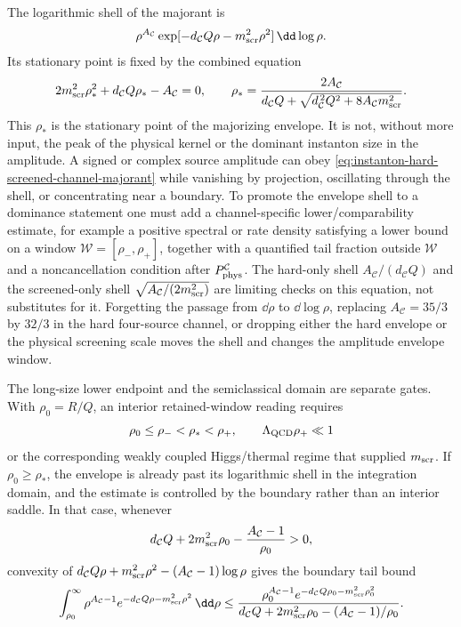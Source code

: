 \begin{controlledapproximation}
The logarithmic shell of the majorant is
\[
  \rho^{A_{\mathcal C}}
  \exp[-d_{\mathcal C}Q\rho-m_{\rm scr}^2\rho^2]\,\dd\log\rho .
\]
Its stationary point is fixed by the combined equation
\begin{equation}
  2m_{\rm scr}^2\rho_*^2+d_{\mathcal C}Q\rho_*-A_{\mathcal C}=0,
  \qquad
  \rho_*=
  \frac{2A_{\mathcal C}}
       {d_{\mathcal C}Q+
        \sqrt{d_{\mathcal C}^{\,2}Q^2+8A_{\mathcal C}m_{\rm scr}^2}} .
  \label{eq:instanton-hard-screened-log-shell}
\end{equation}
This \(\rho_*\) is the stationary point of the majorizing envelope.  It is not,
without more input, the peak of the physical kernel or the dominant instanton
size in the amplitude.  A signed or complex source amplitude can obey
\eqref{eq:instanton-hard-screened-channel-majorant} while vanishing by
projection, oscillating through the shell, or concentrating near a boundary.
To promote the envelope shell to a dominance statement one must add a
channel-specific lower/comparability estimate, for example a positive spectral
or rate density satisfying a lower bound on a window
\(\mathcal W=[\rho_-,\rho_+]\), together with a quantified tail fraction outside
\(\mathcal W\) and a noncancellation condition after \(P_{\rm phys}^{\mathcal C}\).
The hard-only shell \(A_{\mathcal C}/(d_{\mathcal C}Q)\) and the
screened-only shell \(\sqrt{A_{\mathcal C}/(2m_{\rm scr}^2)}\) are limiting
checks on this equation, not substitutes for it.  Forgetting the passage from
\(\dd\rho\) to \(\dd\log\rho\), replacing \(A_{\mathcal C}=35/3\) by
\(32/3\) in the hard four-source channel, or dropping either the hard envelope
or the physical screening scale moves the shell and changes the amplitude
envelope window.

The long-size lower endpoint and the semiclassical domain are separate gates.
With \(\rho_0=R/Q\), an interior retained-window reading requires
\[
  \rho_0\le \rho_-<\rho_*<\rho_+,
  \qquad
  \Lambda_{\rm QCD}\rho_+\ll1
\]
or the corresponding weakly coupled Higgs/thermal regime that supplied
\(m_{\rm scr}\).  If \(\rho_0\ge\rho_*\), the envelope is already past its
logarithmic shell in the integration domain, and the estimate is controlled by
the boundary rather than an interior saddle.  In that case, whenever
\[
  d_{\mathcal C}Q+2m_{\rm scr}^2\rho_0
  -\frac{A_{\mathcal C}-1}{\rho_0}>0,
\]
convexity of
\(
d_{\mathcal C}Q\rho+m_{\rm scr}^2\rho^2-(A_{\mathcal C}-1)\log\rho
\)
gives the boundary tail bound
\[
  \int_{\rho_0}^{\infty}
  \rho^{A_{\mathcal C}-1}
  e^{-d_{\mathcal C}Q\rho-m_{\rm scr}^2\rho^2}\,\dd\rho
  \le
  \frac{
  \rho_0^{A_{\mathcal C}-1}
  e^{-d_{\mathcal C}Q\rho_0-m_{\rm scr}^2\rho_0^2}
  }{
  d_{\mathcal C}Q+2m_{\rm scr}^2\rho_0
  -(A_{\mathcal C}-1)/\rho_0
  } .
\]


\end{controlledapproximation}
